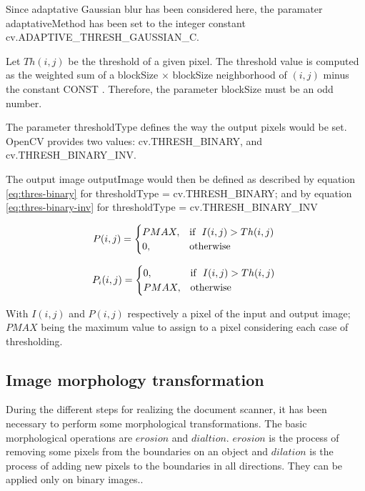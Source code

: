 \documentclass{scrartcl}
\newcommand{\param}[1]{{\ttfamily\footnotesize{#1}}}
\begin{document}
  Since adaptative Gaussian blur has been considered here, the paramater \param{adaptativeMethod}
  has been set to the integer constant \param{cv.ADAPTIVE\_THRESH\_GAUSSIAN\_C}.

  Let $Th(i, j)$ be the threshold of a given pixel. The threshold value is computed as the weighted sum of
  a \param{blockSize} $\times$ \param{blockSize} neighborhood of $(i, j)$ minus the constant \param{CONST}
  \cite{cv-img-thresholding}.
  Therefore, the parameter \param{blockSize} must be an odd number.

  The parameter \param{thresholdType} defines the way the output pixels would be set. OpenCV provides two values:
  \param{cv.THRESH\_BINARY}, and \param{cv.THRESH\_BINARY\_INV}.

  The output image \param{outputImage} would then be defined as described by equation \ref{eq:thres-binary}
  for \param{thresholdType = cv.THRESH\_BINARY}; and by equation \ref{eq:thres-binary-inv} for
  \param{thresholdType = cv.THRESH\_BINARY\_INV} \cite{cv-img-thresholding}

  \begin{equation}
    \centering
    P(i,j) =
      \begin{cases}
        PMAX, & \mbox{if } \mbox{ $I(i, j) > Th(i, j)$ } \\
        0, & \mbox{otherwise} %
      \end{cases}
    \label{eq:thres-binary}
  \end{equation}

  \begin{equation}
    \centering
    P_i(i,j) =
      \begin{cases}
        0, & \mbox{if } \mbox{ $I(i, j) > Th(i, j)$ } \\
        PMAX, & \mbox{otherwise} %
      \end{cases}
    \label{eq:thres-binary-inv}
  \end{equation}

  With $I(i,j)$ and $P(i,j)$ respectively a pixel of the input and output image; $PMAX$ being the
  maximum value to assign to a pixel considering each case of thresholding.

  \subsection{Image morphology transformation}

  During the different steps for realizing the document scanner, it has been necessary to perform some
  morphological transformations. The basic morphological operations are $erosion$ and $dialtion$. $erosion$ is
  the process of removing some pixels from the boundaries on an object and $dilation$ is the process of adding
  new pixels to the boundaries in all directions. They can be applied only on binary images.\cite{opencv-book}.
\end{document}
